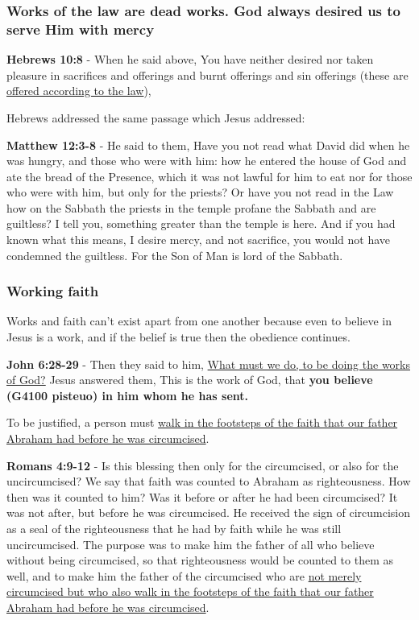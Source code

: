 \documentclass[11pt]{article}
\begin{document}
\subsubsection{Works of the law are dead works. God always desired us to serve Him with mercy}
\label{sec:orgbc12e80}
\textbf{Hebrews 10:8} - When he said above, You have neither desired nor taken pleasure in sacrifices and offerings and burnt offerings and sin offerings (these are \uline{offered according to the law}),

Hebrews addressed the same passage which Jesus addressed:

\textbf{Matthew 12:3-8} - He said to them, Have you not read what David did when he was hungry, and those who were with him: how he entered the house of God and ate the bread of the Presence, which it was not lawful for him to eat nor for those who were with him, but only for the priests? Or have you not read in the Law how on the Sabbath the priests in the temple profane the Sabbath and are guiltless? I tell you, something greater than the temple is here. And if you had known what this means, I desire mercy, and not sacrifice, you would not have condemned the guiltless. For the Son of Man is lord of the Sabbath.

\subsubsection{Working faith}
\label{sec:orgf251b52}
Works and faith can't exist apart from one another because even to believe in Jesus is a work, and if the belief is true then the obedience continues.

\textbf{John 6:28-29} - Then they said to him, \uline{What must we do, to be doing the works of God?} Jesus answered them, This is the work of God, that \textbf{you believe (G4100 pisteuo) in him whom he has sent.}

To be justified, a person must \uline{walk in the footsteps of the faith that our father Abraham had before he was circumcised}.

\textbf{Romans 4:9-12} - Is this blessing then only for the circumcised, or also for the uncircumcised? We say that faith was counted to Abraham as righteousness. How then was it counted to him? Was it before or after he had been circumcised? It was not after, but before he was circumcised. He received the sign of circumcision as a seal of the righteousness that he had by faith while he was still uncircumcised. The purpose was to make him the father of all who believe without being circumcised, so that righteousness would be counted to them as well, and to make him the father of the circumcised who are \uline{not merely circumcised but who also walk in the footsteps of the faith that our father Abraham had before he was circumcised}.
\end{document}
